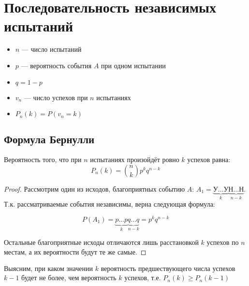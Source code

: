 \documentclass[12pt, a4paper, oneside]{book}
\begin{document}
\section{Последовательность независимых испытаний}

\begin{definition}
    \? %
\end{definition}

\begin{obozn}\itemfix
    \begin{itemize}
        \item \(n\) --- число испытаний
        \item \(p\) --- вероятность события \(A\) при одном испытании
        \item \(q = 1 - p\)
        \item \(v_n\) --- число успехов при \(n\) испытаниях
        \item \(P_n(k) = P(v_n = k)\)
    \end{itemize}
\end{obozn}

\subsection{Формула Бернулли}

\begin{theorem}
    Вероятность того, что при \(n\) испытаниях произойдёт ровно \(k\) успехов равна:
    \[P_n(k) = \binom{n}{k} p^k q^{n - k}\]
\end{theorem}
\begin{proof}
    Рассмотрим один из исходов, благоприятных событию \(A\): \(A_1 = \underbrace{\text{У} \dots \text{У}}_{k} \underbrace{\text{Н} \dots \text{Н}}_{n-k}\). Т.к. рассматриваемые события независимы, верна следующая формула:

    \[P(A_1) = \underbrace{p \dots p}_{k} \underbrace{q \dots q}_{n - k} = p^k q^{n - k}\]

    Остальные благоприятные исходы отличаются лишь расстановкой \(k\) успехов по \(n\) местам, а их вероятности будут те же самые.
\end{proof}

Выясним, при каком значении \(k\) вероятность предшествующего числа успехов \(k - 1\) будет не более, чем вероятность \(k\) успехов, т.е. \(P_n(k) \geq P_n(k - 1)\)
\end{document}
